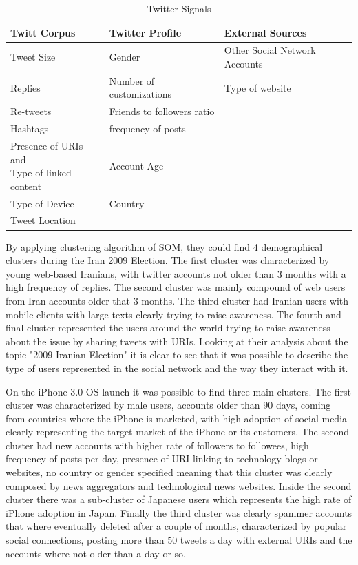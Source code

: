 \begin{table}[H]
  \caption{Twitter Signals}
  \label{tab:twitter_signals}
  \begin{center}
    \begin{tabular}{|l|l|l|}
    \hline

    \hline
    \textbf{Twitt Corpus} & \textbf{Twitter Profile} & \textbf{External Sources} \\
    \hline
       Tweet Size & Gender & Other Social Network Accounts\\
    \hline
       Replies & Number of customizations & Type of website\\
    \hline
       Re-tweets & Friends to followers ratio & \\
    \hline
       Hashtags & frequency of posts & \\
    \hline
      \specialcell{Presence of URIs and \\ Type of linked content}
        & Account Age
        & \\
    \hline
       Type of Device & Country & \\
    \hline
       Tweet Location &  & \\
    \hline
    \end{tabular}
  \end{center}
\end{table}

By applying clustering algorithm of SOM, they could find 4 demographical clusters during the Iran 2009 Election. The first cluster was characterized by young web-based Iranians, with twitter accounts not older than 3 months with a high frequency of replies. The second cluster was mainly compound of web users from Iran accounts older that 3 months. The third cluster had Iranian users with mobile clients with large texts clearly trying to raise awareness. The fourth and final cluster represented the users around the world trying to raise awareness about the issue by sharing tweets with URIs.
Looking at their analysis about the topic "2009 Iranian Election" it is clear to see that it was possible to describe the type of users represented in the social network and the way they interact with it.

On the iPhone 3.0 OS launch it was possible to find three main clusters. The first cluster was characterized by male users, accounts older than 90 days, coming from countries where the iPhone is marketed, with high adoption of social media clearly representing the target market of the iPhone or its customers. The second cluster had new accounts with higher rate of followers to followees, high frequency of posts per day, presence of URI linking to technology blogs or websites, no country or gender specified meaning that this cluster was clearly composed by news aggregators and technological news websites. Inside the second cluster there was a sub-cluster of Japanese users which represents the high rate of iPhone adoption in Japan. Finally the third cluster was clearly spammer accounts that where eventually deleted after a couple of months, characterized by popular social connections, posting more than 50 tweets a day with external URIs and the accounts where not older than a day or so.

